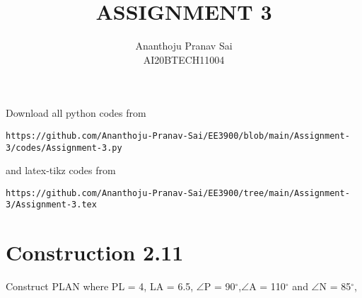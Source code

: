 \documentclass[journal,12pt,twocolumn]{IEEEtran}
\begin{document}
     \def\centbox#1{\makebox[0in]{#1}}
     \def\topbox#1{\raisebox{-\baselineskip}[0in][0in]{#1}}
     \def\midbox#1{\raisebox{-0.5\baselineskip}[0in][0in]{#1}}
\vspace{3cm}
\title{ASSIGNMENT 3}
\author{Ananthoju Pranav Sai \\ AI20BTECH11004}
\maketitle
\newpage
\bigskip
\renewcommand{\thefigure}{\theenumi}
\renewcommand{\thetable}{\theenumi}
Download all python codes from 
\begin{lstlisting}
https://github.com/Ananthoju-Pranav-Sai/EE3900/blob/main/Assignment-3/codes/Assignment-3.py
\end{lstlisting}
%
and latex-tikz codes from 
%
\begin{lstlisting}
https://github.com/Ananthoju-Pranav-Sai/EE3900/tree/main/Assignment-3/Assignment-3.tex
\end{lstlisting}
%
\section{Construction 2.11}
Construct PLAN where PL = 4, LA = 6.5, $\angle$P = 90$^\circ$,$\angle$A = 110$^\circ$ and $\angle$N = 85$^\circ$,
%
\end{document}
